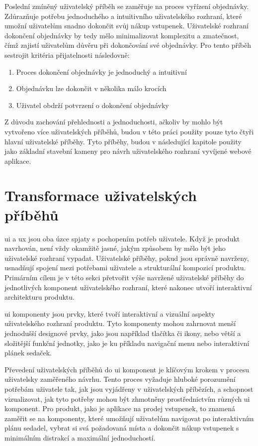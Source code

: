 Poslední zmíněný uživatelský příběh se zaměřuje na proces vyřízení objednávky.
Zdůrazňuje potřebu jednoduchého a intuitivního uživatelského rozhraní, které umožní uživatelům snadno dokončit svůj nákup vstupenek.
Uživatelské rozhraní dokončení objednávky by tedy mělo minimalizovat komplexitu a zmatečnost, čímž zajistí uživatelům důvěru při dokončování své objednávky.
Pro tento příběh sestrojit kritéria přijatelnosti následovně:
\begin{enumerate}
    \item Proces dokončení objednávky je jednoduchý a intuitivní
    \item Objednávku lze dokončit v několika málo krocích
    \item Uživatel obdrží potvrzení o dokončení objednávky
\end{enumerate}

Z důvodu zachování přehlednosti a jednoduchosti, ačkoliv by mohlo být vytvořeno více uživatelských příběhů, budou v této práci použity pouze tyto čtyři hlavní uživatelské příběhy.
Tyto příběhy, budou v následující kapitole použity jako základní stavební kameny pro návrh uživatelského rozhraní vyvíjené webové aplikace.


\section{Transformace uživatelských příběhů}
\label{sec:navrh-ui-transformace-uzivatelskych-pribehu}
\acl{ui} a \acl{ux} jsou oba úzce spjaty s pochopením potřeb uživatele.
Když je produkt navrhován, není vždy okamžitě jasné, jakým způsobem by mělo být jeho uživatelské rozhraní vypadat.
Uživatelské příběhy, pokud jsou správně navrženy, usnadňují spojení mezi potřebami uživatele a strukturální kompozicí produktu.
Primárním cílem je v této sekci přetvořit výše navržené uživatelské příběhy do jednotlivých komponent uživatelského rozhraní, které nakonec utvoří interaktivní architekturu produktu.

\ac{ui} komponenty jsou prvky, které tvoří interaktivní a vizuální aspekty uživatelského rozhraní produktu.
Tyto komponenty mohou zahrnovat menší jednodušší designové prvky, jako jsou například tlačítka či ikony, nebo větší a složitější funkční jednotky, jako je ku příkladu navigační menu nebo interaktivní plánek sedaček.

Převedení uživatelských příběhů do \ac{ui} komponent je klíčovým krokem v procesu uživatelsky zaměřeného návrhu.
Tento proces vyžaduje hluboké porozumění potřebám uživatele tak, jak jsou vyjádřeny v uživatelských příbězích, a schopnost vizualizovat, jak tyto potřeby mohou být zhmotněny prostřednictvím různých \ac{ui} komponent.
Pro produkt, jako je aplikace na prodej vstupenek, to znamená zaměřit se na komponenty, které umožňují uživatelům navigovat po interaktivním plánu sedadel, vybrat si svá požadovaná místa a dokončit nákup vstupenek s minimálním distrakcí a maximální jednoduchostí.

